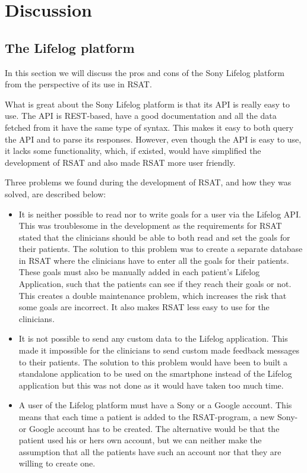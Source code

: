 \documentclass{cslthse-msc}
\begin{document}
\chapter{Discussion}

\section{The Lifelog platform}

In this section we will discuss the pros and cons of the Sony Lifelog platform from the perspective of its use in RSAT. 

What is great about the Sony Lifelog platform is that its API is really easy to use. The API is REST-based, have a good documentation and all the data fetched from it have the same type of syntax. This makes it easy to both query the API and to parse its responses. However, even though the API is easy to use, it lacks some functionality, which, if existed, would have simplified the development of RSAT and also made RSAT more user friendly. 

Three problems we found during the development of RSAT, and how they was solved, are described below:

\begin{itemize}

\item It is neither possible to read nor to write goals for a user via the Lifelog API. This was troublesome in the development as the requirements for RSAT stated that the clinicians should be able to both read and set the goals for their patients. The solution to this problem was to create a separate database in RSAT where the clinicians have to enter all the goals for their patients. These goals must also be manually added in each patient’s Lifelog Application, such that the patients can see if they reach their goals or not. This creates a double maintenance problem, which increases the risk that some goals are incorrect. It also makes RSAT less easy to use for the clinicians. 

\item It is not possible to send any custom data to the Lifelog application. This made it impossible for the clinicians to send custom made feedback messages to their patients. The solution to this problem would have been to built a standalone application to be used on the smartphone instead of the Lifelog application but this was not done as it would have taken too much time. 

\item A user of the Lifelog platform must have a Sony or a Google account. This means that each time a patient is added to the RSAT-program, a new Sony- or Google account has to be created. The alternative would be that the patient used his or hers own account, but we can neither make the assumption that all the patients have such an account nor that they are willing to create one. 

\end{itemize}
\end{document}
